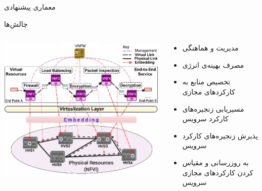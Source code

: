 \documentclass{beamer}
\makeatletter
\newcommand{\RTList}{\raggedleft\rightskip\@totalleftmargin}
\makeatother
\begin{document}
\begin{persian}
\begin{frame}{معماری پیشنهادی}
\end{frame}
\begin{frame}{چالش‌ها}
    \begin{columns}
        \begin{column}{0.6\textwidth}
            \includegraphics[scale=0.35]{images/embedding.png}
        \end{column}
        \begin{column}{0.4\textwidth}
            \begin{itemize}\RTList{}
                \justifying
                \item مدیریت و هماهنگی
                \item مصرف بهینه‌ی انرژی
                \item تخصیص منابع به کارکردهای مجازی
                \item مسیریابی زنجیره‌های کارکرد سرویس
                \item پذیرش زنجیره‌های کارکرد سرویس
                \item به روزرسانی و مقیاس کردن کارکردهای مجازی سرویس
            \end{itemize}
        \end{column}
    \end{columns}
\end{frame}
\begin{frame}{}

\end{frame}
\end{persian}
\end{document}
